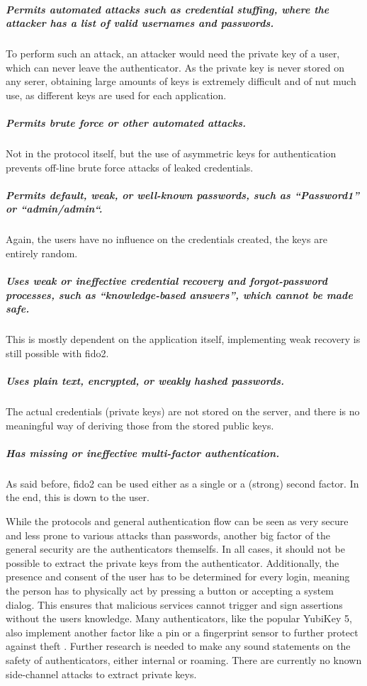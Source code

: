 \noindent\subparagraph{Permits automated attacks such as credential stuffing, where the attacker has a list of valid usernames and passwords.} To perform such an attack, an attacker would need the private key of a user, which can never leave the authenticator. As the private key is never stored on any serer, obtaining large amounts of keys is extremely difficult and of nut much use, as different keys are used for each application.

\noindent\subparagraph{Permits brute force or other automated attacks.} Not in the protocol itself, but the use of asymmetric keys for authentication prevents off-line brute force attacks of leaked credentials.

\noindent\subparagraph{Permits default, weak, or well-known passwords, such as “Password1” or “admin/admin“.} Again, the users have no influence on the credentials created, the keys are entirely random.

\noindent\subparagraph{Uses weak or ineffective credential recovery and forgot-password processes, such as “knowledge-based answers”, which cannot be made safe.} This is mostly dependent on the application itself, implementing weak recovery is still possible with \ac{fido2}.

\noindent\subparagraph{Uses plain text, encrypted, or weakly hashed passwords.} The actual credentials (private keys) are not stored on the server, and there is no meaningful way of deriving those from the stored public keys.

\noindent\subparagraph{Has missing or ineffective multi-factor authentication.} As said before, \ac{fido2} can be used either as a single or a (strong) second factor. In the end, this is down to the user.

\noindent While the protocols and general authentication flow can be seen as very secure and less prone to various attacks than passwords, another big factor of the general security are the authenticators themselfs. In all cases, it should not be possible to extract the private keys from the authenticator. Additionally, the presence and consent of the user has to be determined for every login, meaning the person has to physically act by pressing a button or accepting a system dialog. This ensures that malicious services cannot trigger and sign assertions without the users knowledge. Many authenticators, like the popular YubiKey 5, also implement another factor like a \ac{pin} or a fingerprint sensor to further protect against theft \cite{yubikey_5_nfc,dunkelberger2018}.
Further research is needed to make any sound statements on the safety of authenticators, either internal or roaming. There are currently no known side-channel attacks to extract private keys.\\


